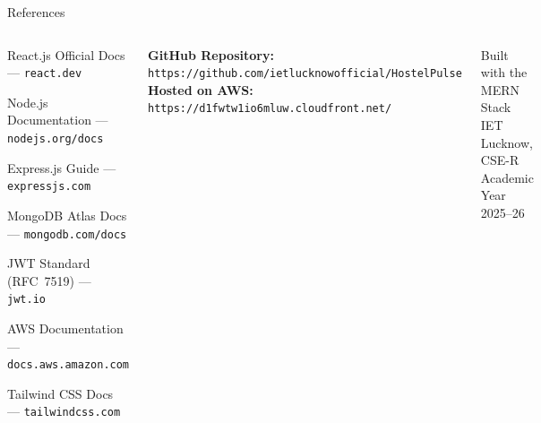 \documentclass[aspectratio=169]{beamer}
\begin{document}
\begin{frame}{References}{}
  \begin{columns}[t]
    \begin{tcolorbox}[infobox,
        title={\color{white}\small\bfseries\faBook\ Documentation \& Resources},
        colbacktitle=NavyBlue]
      \begin{enumerate}\setlength\itemsep{0.28em}
        {\small
        \item React.js Official Docs --- \texttt{react.dev}
        \item Node.js Documentation --- \texttt{nodejs.org/docs}
        \item Express.js Guide --- \texttt{expressjs.com}
        \item MongoDB Atlas Docs --- \texttt{mongodb.com/docs}
        \item JWT Standard (RFC~7519) --- \texttt{jwt.io}
        \item AWS Documentation --- \texttt{docs.aws.amazon.com}
        \item Tailwind CSS Docs --- \texttt{tailwindcss.com}
        }
      \end{enumerate}
    \end{tcolorbox}

    \begin{tcolorbox}[accentbox,
        title={\color{white}\small\bfseries\faLink\ Project Links},
        colbacktitle=TealPrimary]
      {\small
      \textbf{GitHub Repository:}\\[2pt]
      {\footnotesize\texttt{https://github.com/ietlucknowofficial/HostelPulse}}\\[8pt]
      \textbf{Hosted on AWS:}\\[2pt]
      {\footnotesize\texttt{https://d1fwtw1io6mluw.cloudfront.net/}}
      }
    \end{tcolorbox}
    \vspace{0.2cm}
    \begin{tcolorbox}[featurebox]
      {\small\color{MutedGray}
       \faCode\quad Built with the MERN Stack\\[3pt]
       \faUniversity\quad IET Lucknow, CSE-R\\[3pt]
       \faCalendar\quad Academic Year 2025--26}
    \end{tcolorbox}
  \end{columns}
\end{frame}
\end{document}
